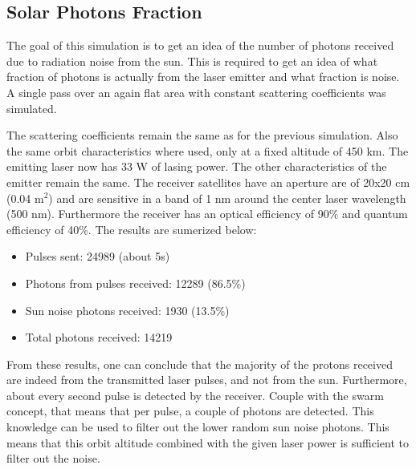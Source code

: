 \subsection{Solar Photons Fraction}
\label{sec:SolarPhotonsFraction}

The goal of this simulation is to get an idea of the number of photons received due to radiation noise from the sun. This is required to get an idea of what fraction of photons is actually from the laser emitter and what fraction is noise. A single pass over an again flat area with constant scattering coefficients was simulated.

The scattering coefficients remain the same as for the previous simulation. Also the same orbit characteristics where used, only at a fixed altitude of 450 km. The emitting \ac{laser} now has 33 W of lasing power. The other characteristics of the emitter remain the same. The receiver satellites have an aperture are of 20x20 cm (0.04 m$^2$) and are sensitive in a band of 1 nm around the center laser wavelength (500 nm). Furthermore the receiver has an optical efficiency of 90\% and quantum efficiency of 40\%. The results are sumerized below:

\begin{itemize}
	\item Pulses sent: 24989 (about 5s)
	\item Photons from pulses received: 12289 (86.5\%)
	\item Sun noise photons received: 1930 (13.5\%)
	\item Total photons received: 14219
\end{itemize}

From these results, one can conclude that the majority of the protons received are indeed from the transmitted \ac{laser} pulses, and not from the sun. Furthermore, about every second pulse is detected by the receiver. Couple with the swarm concept, that means that per pulse, a couple of photons are detected. This knowledge can be used to filter out the lower random sun noise photons. This means that this orbit altitude combined with the given laser power is sufficient to filter out the noise.